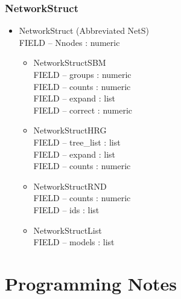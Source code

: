 \documentclass[11pt]{article}
\begin{document}
\subsubsection{NetworkStruct}
\begin{itemize}

\item NetworkStruct (Abbreviated NetS)\\
FIELD -- Nnodes : numeric
\begin{itemize}
\item NetworkStructSBM\\
FIELD -- groups : numeric\\
FIELD -- counts : numeric\\
FIELD -- expand : list\\
FIELD -- correct : numeric\\
\item NetworkStructHRG\\
FIELD -- tree\_list : list\\
FIELD -- expand : list\\
FIELD -- counts : numeric\\
\item NetworkStructRND\\
FIELD -- counts : numeric\\
FIELD -- ids : list\\
\item NetworkStructList\\
FIELD -- models : list\\
\end{itemize}
\end{itemize}












\section{Programming Notes}
\end{document}
